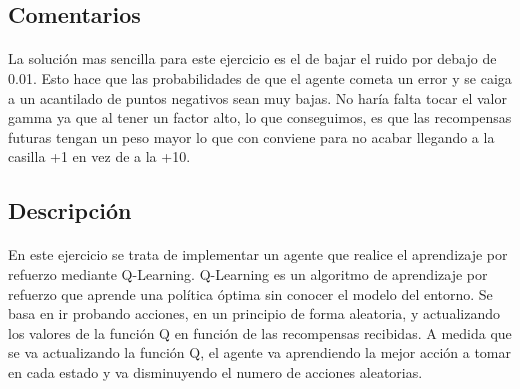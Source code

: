 \documentclass{report}
\begin{document}
      \subsection*{Comentarios}
        \paragraph*{}{
          La solución mas sencilla para este ejercicio es el de bajar el ruido por debajo de 0.01.
          Esto hace que las probabilidades de que el agente cometa un error y se caiga a un acantilado de puntos negativos sean muy bajas.
          No haría falta tocar el valor gamma ya que al tener un factor alto, lo que conseguimos, es que las recompensas futuras tengan un peso mayor lo que con conviene para no acabar llegando a la casilla +1 en vez de a la +10.
        }
      \subsection*{Descripción}
        \paragraph*{}
        {
          En este ejercicio se trata de implementar un agente que realice el aprendizaje por refuerzo mediante Q-Learning.
          Q-Learning es un algoritmo de aprendizaje por refuerzo que aprende una política óptima sin conocer el modelo del entorno.
          Se basa en ir probando acciones, en un principio de forma aleatoria, y actualizando los valores de la función Q en función de las recompensas recibidas.
          A medida que se va actualizando la función Q, el agente va aprendiendo la mejor acción a tomar en cada estado y va disminuyendo el numero de acciones aleatorias.
        }
\end{document}
